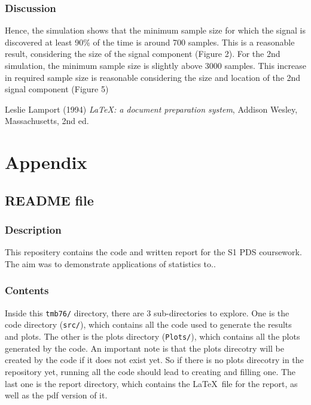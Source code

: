 \documentclass[12pt]{report} %
\begin{document}
\subsubsection*{Discussion}
Hence, the simulation shows that the minimum sample size for which the signal is discovered at least 90\% of the time is around 700 samples. This is a reasonable result, considering the size of the signal component (Figure 2). For the 2nd simulation, the minimum sample size is slightly above 3000 samples. This increase in required sample size is reasonable considering the size and location of the 2nd signal component (Figure 5)


\begin{thebibliography}{9}

    \cite{Larry Wasserman2004}

    Leslie Lamport (1994) \emph{\LaTeX: a document preparation system}, Addison
    Wesley, Massachusetts, 2nd ed.
    \end{thebibliography}


\section*{Appendix}

\subsection*{README file}

\subsubsection*{Description} 
This repositery contains the code and written report for the S1 PDS coursework. The aim was to demonstrate applications of statistics to..

\subsubsection*{Contents}  
Inside this \texttt{tmb76/} directory, there are 3 sub-directories to explore. One is the code directory (\texttt{src/}), which contains all the code used to generate the results and plots. The other is the plots directory (\texttt{Plots/}), which contains all the plots generated by the code. An important note is that the plots direcotry will be created by the code if it does not exist yet. So if there is no plots direcotry in the repository yet, running all the code should lead to creating and filling one. The last one is the report directory, which contains the \LaTeX\ file for the report, as well as the pdf version of it. 
\end{document}
